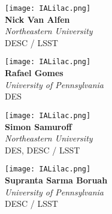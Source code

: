 \documentclass[12pt,letterpaper]{article}
\begin{document}
\begin{multicols}{2}
    \begin{minipage}[t][2in][c]{.45\textwidth}
    \centering
    \texttt{[image: IALilac.png]}\\ \vspace{.5cm}
    \Huge \textbf{Nick Van Alfen}\\
    \vspace{0.5cm}
    \Large \textit{Northeastern University} \\
    \vspace{0.5cm}
    \small DESC / LSST
    \end{minipage}
    \vspace{1cm}
    
    \begin{minipage}[t][2in][c]{.45\textwidth}
    \centering
    \texttt{[image: IALilac.png]}\\ \vspace{.5cm}
    \Huge \textbf{Rafael Gomes}\\
    \vspace{0.5cm}
    \Large \textit{University of Pennsylvania} \\
    \vspace{0.5cm}
    \small DES
    \end{minipage}
    \vspace{1cm}
    
    \begin{minipage}[t][2in][c]{.45\textwidth}
    \centering
    \texttt{[image: IALilac.png]}\\ \vspace{.5cm}
    \Huge \textbf{Simon Samuroff}\\
    \vspace{0.5cm}
    \Large \textit{Northeastern University} \\
    \vspace{0.5cm}
    \small DES, DESC / LSST
    \end{minipage}
    \vspace{1cm}
    
    \begin{minipage}[t][2in][c]{.45\textwidth}
    \centering
    \texttt{[image: IALilac.png]}\\ \vspace{.5cm}
    \LARGE \textbf{Supranta Sarma Boruah}\\
    \vspace{0.5cm}
    \Large \textit{University of Pennsylvania} \\
    \vspace{0.5cm}
    \small DESC / LSST
    \end{minipage}
    \vspace{1cm}
    

\end{multicols}
\end{document}
